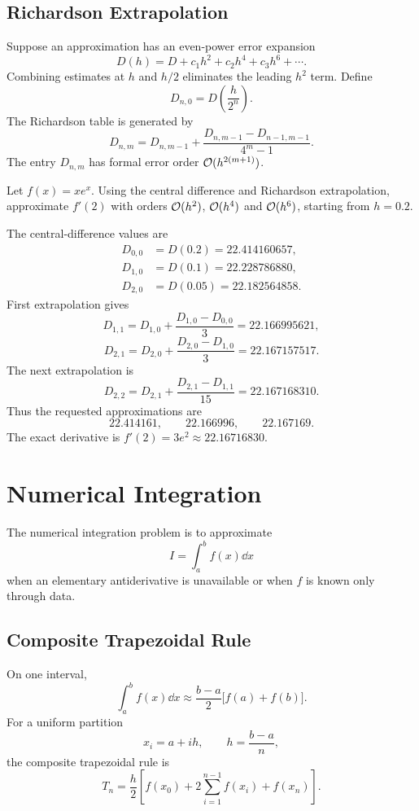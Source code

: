 \subsection{Richardson Extrapolation}

Suppose an approximation has an even-power error expansion
\[
 D(h)=D+c_1h^2+c_2h^4+c_3h^6+\cdots.
\]
Combining estimates at $h$ and $h/2$ eliminates the leading $h^2$ term.  Define
\[
 D_{n,0}=D\left(\frac{h}{2^n}\right).
\]
The Richardson table is generated by
\[
 D_{n,m}
 =D_{n,m-1}
 +\frac{D_{n,m-1}-D_{n-1,m-1}}{4^m-1}.
\]
The entry $D_{n,m}$ has formal error order $\mathcal O(h^{2(m+1)})$.

\begin{example}
Let $f(x)=xe^x$.  Using the central difference and Richardson extrapolation, approximate $f'(2)$ with orders $\mathcal O(h^2)$, $\mathcal O(h^4)$ and $\mathcal O(h^6)$, starting from $h=0.2$.
\end{example}

\begin{solution}[7.2cm]
The central-difference values are
\[
\begin{aligned}
D_{0,0}&=D(0.2)=22.414160657,\\
D_{1,0}&=D(0.1)=22.228786880,\\
D_{2,0}&=D(0.05)=22.182564858.
\end{aligned}
\]
First extrapolation gives
\[
 D_{1,1}=D_{1,0}+\frac{D_{1,0}-D_{0,0}}3
 =22.166995621,
\]
\[
 D_{2,1}=D_{2,0}+\frac{D_{2,0}-D_{1,0}}3
 =22.167157517.
\]
The next extrapolation is
\[
 D_{2,2}=D_{2,1}+\frac{D_{2,1}-D_{1,1}}{15}
 =22.167168310.
\]
Thus the requested approximations are
\[
 22.414161,
 \qquad22.166996,
 \qquad22.167169.
\]
The exact derivative is $f'(2)=3e^2\approx22.16716830$.
\end{solution}

\section{Numerical Integration}

The numerical integration problem is to approximate
\[
 I=\int_a^b f(x)\dd x
\]
when an elementary antiderivative is unavailable or when $f$ is known only through data.

\subsection{Composite Trapezoidal Rule}

On one interval,
\[
 \int_a^b f(x)\dd x
 \approx\frac{b-a}{2}\bigl[f(a)+f(b)\bigr].
\]
For a uniform partition
\[
 x_i=a+ih,
 \qquad h=\frac{b-a}{n},
\]
the composite trapezoidal rule is
\[
 T_n=\frac h2
 \left[f(x_0)+2\sum_{i=1}^{n-1}f(x_i)+f(x_n)\right].
\]

